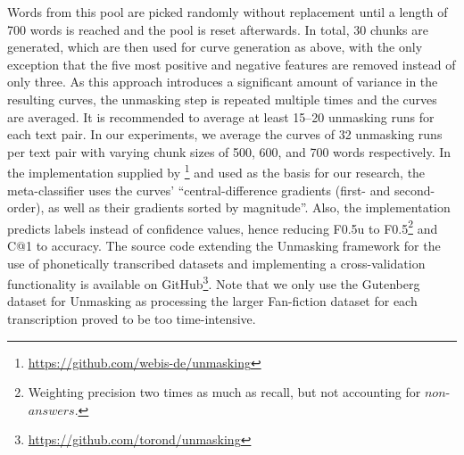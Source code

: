 Words from this pool are picked randomly without replacement until a length of 700 words is reached and the pool is reset afterwards.
In total, 30 chunks are generated, which are then used for curve generation as above, with the only exception that the five most positive and negative features are removed instead of only three.
As this approach introduces a significant amount of variance in the resulting curves, the unmasking step is repeated multiple times and the curves are averaged.
It is recommended to average at least 15--20 unmasking runs for each text pair.
In our experiments, we average the curves of 32 unmasking runs per text pair with varying chunk sizes of 500, 600, and 700 words respectively.
In the implementation supplied by \cite{bevendorff2019unmaskingShortTexts}\footnote{\url{https://github.com/webis-de/unmasking}} and used as the basis for our research, the meta-classifier uses the curves' ``central-difference gradients (first- and second-order), as well as their gradients sorted by magnitude''.
Also, the implementation predicts labels instead of confidence values, hence reducing F0.5u to F0.5\footnote{Weighting precision two times as much as recall, but not accounting for $non$-$answers$.} and C@1 to accuracy.
The source code extending the Unmasking framework for the use of phonetically transcribed datasets and implementing a cross-validation functionality is available on GitHub\footnote{\url{https://github.com/torond/unmasking}}.
Note that we only use the Gutenberg dataset for Unmasking as processing the larger Fan-fiction dataset for each transcription proved to be too time-intensive.